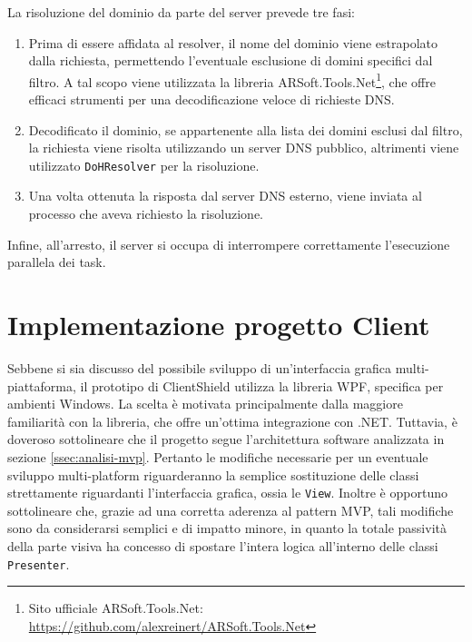 \documentclass[12pt,a4paper,openright,twoside]{book}
\newcommand{\class}[1]{\texttt{#1}}
\begin{document}
La risoluzione del dominio da parte del server prevede tre fasi:
\begin{enumerate}
	\item Prima di essere affidata al resolver, il nome del dominio viene estrapolato dalla richiesta, permettendo l'eventuale esclusione di domini specifici dal filtro.
	A tal scopo viene utilizzata la libreria ARSoft.Tools.Net\footnote{Sito ufficiale ARSoft.Tools.Net: \url{https://github.com/alexreinert/ARSoft.Tools.Net}}, che offre efficaci strumenti per una decodificazione veloce di richieste \gls{DNS}.
	
	\item Decodificato il dominio, se appartenente alla lista dei domini esclusi dal filtro, la richiesta viene risolta utilizzando un server \gls{DNS} pubblico, altrimenti viene utilizzato \class{DoHResolver} per la risoluzione.
	
	\item Una volta ottenuta la risposta dal server \gls{DNS} esterno, viene inviata al processo che aveva richiesto la risoluzione.
\end{enumerate}
Infine, all'arresto, il server si occupa di interrompere correttamente l'esecuzione parallela dei task.

\section{Implementazione progetto Client}

Sebbene si sia discusso del possibile sviluppo di un'interfaccia grafica multi-piattaforma, il prototipo di ClientShield utilizza la libreria \gls{WPF}, specifica per ambienti Windows.
La scelta è motivata principalmente dalla maggiore familiarità con la libreria, che offre un'ottima integrazione con .NET.
Tuttavia, è doveroso sottolineare che il progetto segue l'architettura software analizzata in sezione \ref{ssec:analisi-mvp}.
Pertanto le modifiche necessarie per un eventuale sviluppo multi-platform riguarderanno la semplice sostituzione delle classi strettamente riguardanti l'interfaccia grafica, ossia le \class{View}.
Inoltre è opportuno sottolineare che, grazie ad una corretta aderenza al pattern \gls{MVP}, tali modifiche sono da considerarsi semplici e di impatto minore, in quanto la totale passività della parte visiva ha concesso di spostare l'intera logica all'interno delle classi \class{Presenter}.
\end{document}
